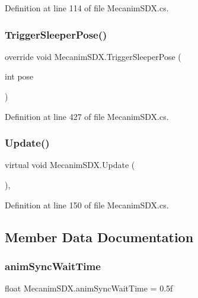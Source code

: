 Definition at line 114 of file Mecanim\+S\+D\+X.\+cs.

\mbox{\label{class_mecanim_s_d_x_abb807832f89cffba09a1669ddb33fed4}} 
\subsubsection{\texorpdfstring{TriggerSleeperPose()}{TriggerSleeperPose()}}
{\footnotesize\ttfamily override void Mecanim\+S\+D\+X.\+Trigger\+Sleeper\+Pose (\begin{DoxyParamCaption}\item[{int}]{pose }\end{DoxyParamCaption})}



Definition at line 427 of file Mecanim\+S\+D\+X.\+cs.

\mbox{\label{class_mecanim_s_d_x_af4c9192fb629edf0821cf4eb551459cf}} 
\subsubsection{\texorpdfstring{Update()}{Update()}}
{\footnotesize\ttfamily virtual void Mecanim\+S\+D\+X.\+Update (\begin{DoxyParamCaption}{ }\end{DoxyParamCaption})\hspace{0.3cm}{\ttfamily [protected]}, {\ttfamily [virtual]}}



Definition at line 150 of file Mecanim\+S\+D\+X.\+cs.



\subsection{Member Data Documentation}
\mbox{\label{class_mecanim_s_d_x_a708fb6d1c48407ed93961d2809315770}} 
\subsubsection{\texorpdfstring{animSyncWaitTime}{animSyncWaitTime}}
{\footnotesize\ttfamily float Mecanim\+S\+D\+X.\+anim\+Sync\+Wait\+Time = 0.\+5f}



